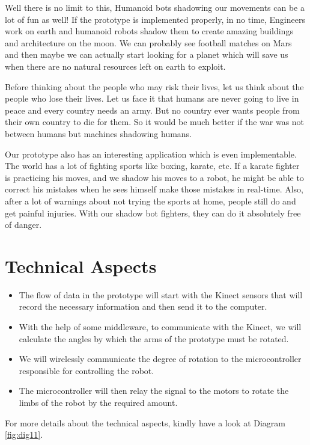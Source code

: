 \documentclass[11pt]{article}
\begin{document}
Well there is no limit to this, Humanoid bots shadowing our movements can be a lot of fun as well! If the prototype is implemented properly, in no time, Engineers work on earth and humanoid robots shadow them to create amazing buildings and architecture on the moon. We can probably see football matches on Mars and then maybe we can actually start looking for a planet which will save us when there are no natural resources left on earth to exploit. 

Before thinking about the people who may risk their lives, let us think about the people who lose their lives. Let us face it that humans are never going to live in peace and every country needs an army. But no country ever wants people from their own country to die for them. So it would be much better if the war was not between humans but machines shadowing humans.

Our prototype also has an interesting application which is even implementable. The world has a lot of fighting sports like boxing, karate, etc. If a karate fighter is practicing his moves, and we shadow his moves to a robot, he might be able to correct his mistakes when he sees himself make those mistakes in real-time. Also, after a lot of warnings about not trying the sports at home, people still do and get painful injuries. With our shadow bot fighters, they can do it absolutely free of danger.
\section{\textbf{Technical Aspects}}
\label{sec-5}

\begin{itemize}
\item The flow of data in the prototype will start with the Kinect sensors that will record the necessary information and then send it to the computer.
\item With the help of some middleware, to communicate with the Kinect, we will calculate the angles by which the arms of the prototype must be rotated.
\item We will wirelessly communicate the degree of rotation to the microcontroller responsible for controlling the robot.
\item The microcontroller will then relay the signal to the motors to rotate the limbs of the robot by the required amount.
\end{itemize}

For more details about the technical aspects, kindly have a look at Diagram \ref{fig:dig11}.
\end{document}
